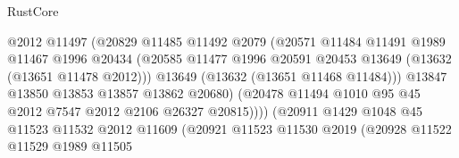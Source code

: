 \begin{lexlean}{RustCore}
\begin{coremodule}
                                      @2012
                                      @11497
                                      (@20829
                                        @11485
                                        @11492
                                        @2079
                                        (@20571
                                          @11484
                                          @11491
                                          @1989
                                          @11467
                                          @1996
                                          @20434
                                          (@20585
                                            @11477
                                            @1996
                                            @20591
                                            @20453
                                            @13649
                                            (@13632 (@13651 @11478 @2012)))
                                          @13649
                                          (@13632 (@13651 @11468 @11484)))
                                        @13847
                                        @13850
                                        @13853
                                        @13857
                                        @13862
                                        @20680)
                                      (@20478
                                        @11494
                                        @1010
                                        @95
                                        @45
                                        @2012
                                        @7547
                                        @2012
                                        @2106
                                        @26327
                                        @20815))))
                                (@20911
                                  @1429
                                  @1048
                                  @45
                                  @11523
                                  @11532
                                  @2012
                                  @11609
                                  (@20921
                                    @11523
                                    @11530
                                    @2019
                                    (@20928
                                      @11522
                                      @11529
                                      @1989
                                      @11505

\end{coremodule}
\end{lexlean}
